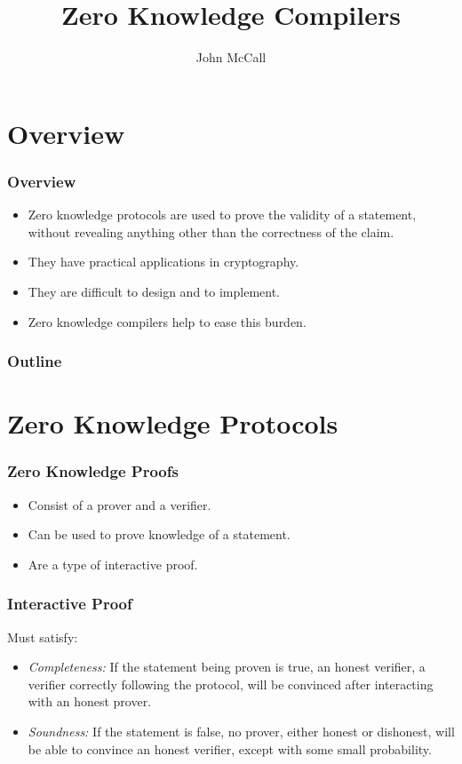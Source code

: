 \documentclass{beamer}
\title[Zero Knowledge Compilers]{Zero Knowledge Compilers}
\author[McCall]{John McCall}
\institute[U of Minn, Morris]
{
  Division of Science and Mathematics \\
  University of Minnesota, Morris \\
  Morris, Minnesota, USA
}
\begin{document}
\begin{frame}
	\titlepage
\end{frame}

\section*{Overview}

\begin{frame}
	\frametitle{Overview}
	\begin{itemize}
		\item Zero knowledge protocols are used to prove the validity of a statement, without revealing anything other than the correctness of the claim.
		\item They have practical applications in cryptography.
		
		\item They are difficult to design and to implement.
		
		\item Zero knowledge compilers help to ease this burden.
	\end{itemize}
\end{frame}

\begin{frame}
	\frametitle{Outline}
	\tableofcontents[hideallsubsections]
\end{frame}

\section{Zero Knowledge Protocols}

\begin{frame}
	\frametitle{Zero Knowledge Proofs}
	\begin{itemize}
		\item Consist of a prover and a verifier.
		
		\item Can be used to prove knowledge of a statement.
		
		\item Are a type of interactive proof.
	\end{itemize}
\end{frame}

\begin{frame}
	\frametitle{Interactive Proof}
	Must satisfy:
	\begin{itemize}
		\item \textit{Completeness:} If the statement being proven is true, an
		honest verifier, a verifier correctly following the protocol, will be
		convinced after interacting with an honest prover.

		\item \textit{Soundness:} If the statement is false, no prover, either
		honest or dishonest, will be able to convince an honest verifier, except
		with some small probability.
	\end{itemize}
\end{frame}
\end{document}

